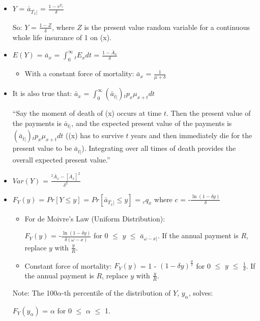 \documentclass[]{book}
\providecommand{\tightlist}{%
  \setlength{\itemsep}{0pt}\setlength{\parskip}{0pt}}
\begin{document}
\begin{itemize}
\item
  \(Y\) = \(\bar{a}_{\overline{T_x}|}\) = \(\frac{1 - v^{T_x}}{\delta}\)

  So: \(Y\) = \(\frac{1 - Z}{\delta}\), where \(Z\) is the present value
  random variable for a continuous whole life insurance of 1 on (x).
\item
  \(E(Y)\) = \(\bar{a}_x\) = \(\int^{\infty}_{0} {}_{t}E_xdt\) =
  \(\frac{1 - \bar{A}_x}{\delta}\)

  \begin{itemize}
  \tightlist
  \item
    With a constant force of mortality: \(\bar{a}_x\) =
    \(\frac{1}{\mu + \delta}\)
  \end{itemize}
\item
  It is also true that: \(\bar{a}_x\) =
  \(\int^{\infty}_{0} (\bar{a}_{\overline{t}|}){}_{t}p_x\mu_{x + t} dt\)

  ``Say the moment of death of (x) occurs at time \(t\). Then the
  present value of the payments is \(\bar{a}_{\overline{t}|}\), and the
  expected present value of the payments is
  \((\bar{a}_{\overline{t}|}){}_{t}p_x\mu_{x + t} dt\) ((x) has to
  survive \(t\) years and then immediately die for the present value to
  be \(\bar{a}_{\overline{t}|}\)). Integrating over all times of death
  provides the overall expected present value.''
\item
  \(Var(Y)\) = \(\frac{^2\bar{A}_x - [\bar{A}_x]^2}{\delta^2}\)
\item
  \(F_Y(y)\) = \(Pr[Y \le y]\) = \(Pr[\bar{a}_{\overline{T_x}|} \le y]\)
  = \({}_{c}q_x\) where \(c\) = -\(\frac{\ln(1 - \delta y)}{\delta}\)

  \begin{itemize}
  \item
    For de Moivre's Law (Uniform Distribution):

    \(F_Y(y)\) = -\(\frac{\ln(1 - \delta y)}{\delta (\omega - x)}\) for
    0 \(\le\) \(y\) \(\le\) \(\bar{a}_{\overline{\omega - x}|}\). If the
    annual payment is \(R\), replace \(y\) with \(\frac{y}{R}\).
  \item
    Constant force of mortality: \(F_Y(y)\) = 1 -
    \((1 - \delta y)^\frac{\mu}{\delta}\) for 0 \(\le\) \(y\) \(\le\)
    \(\frac{1}{\delta}\). If the annual payment is \(R\), replace \(y\)
    with \(\frac{y}{R}\).
  \end{itemize}

  Note: The 100\(\alpha\)-th percentile of the distribution of \(Y\),
  \(y_{\alpha}\), solves:

  \(F_Y(y_{\alpha})\) = \(\alpha\) for 0 \(\le\) \(\alpha\) \(\le\) 1.
\end{itemize}
\end{document}
